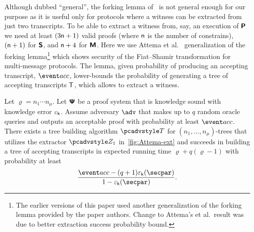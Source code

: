 Although dubbed ``general'', the forking lemma of~\cite{CCS:BelNev06} is not general
enough for our purpose as it is useful only for protocols where a witness can be
extracted from just two transcripts. To be able to extract a witness from, say, an
execution of $\bm{\mathsf{P}}$ we need at least $(3 \mathsf{n} + 1)$ valid proofs
(where $\mathsf{n}$ is the number of constrains),
$(\mathsf{n}+ 1)$ for $\bm{\mathsf{S}}$, and $\mathsf{n} + 4$ for $\bm{\mathsf{M}}$. Here we use Attema et
al.~\cite{EPRINT:AttFehKlo21} generalization of the forking lemma\footnote{The
	earlier versions of this paper used another generalization of the forking lemma
	provided by the paper authors. Change to Attema's et al.~result was due to better
	extraction success probability bound.}  which shows security of the Fiat--Shamir
transformation for multi-message protocols. The lemma, given probability of producing
an accepting transcript, $\accProb$, lower-bounds the probability of generating a
tree of accepting transcripts $\mathsf{T}$, which allows to extract a witness.



  \begin{lemma}\label{lem:attema}
	Let $\varrho = n_1 \cdots n_\mu$.  Let $\bm{\mathsf{\Psi}}$ be a proof system that is knowledge sound  
	with knowledge error $\varepsilon_{\mathsf{k}}$. Assume adversary $\adv$ that makes up to $q$ random
	oracle queries and outputs an acceptable proof with probability at least
	$\accProb$. There exists a tree building algorithm $\tdv$ for $(n_1, \ldots, n_\mu)$-trees that utilizes the extractor $\zdv_1$ in~\cref{fig:Attema-ext} and succeeds in building a
	tree of accepting transcripts in expected
	running time $\varrho + q (\varrho - 1)$ with probability at least
	\[
	\frac{\accProb - (q + 1) \epsk (\secpar)}{1 - \epsk (\secpar)}.
	\]
	\end{lemma}

